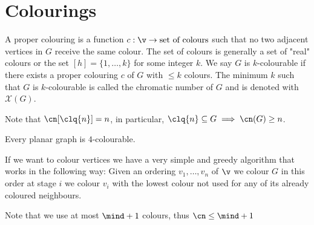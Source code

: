 \chapter{Colourings}
A proper colouring is a function $c: \v \rightarrow \text{set of colours}$ such that no two adjacent vertices in $G$ receive the same colour. The set of colours is generally a set of "real" colours or the set $[h] = \{1, \dots, k\}$ for some integer $k$. We say $G$ is $k$-colourable if there exists a proper colouring $c$ of $G$ with $\leq k$ colours. The minimum $k$ such that $G$ is $k$-colourable is called the chromatic number of $G$ and is denoted with $\mathcal{X}(G)$.

Note that $\cn[\clq{n}] = n$, in particular, $\clq{n} \subseteq G \implies \cn(G) \geq n$.
\begin{customtheorem}{6.1}
\label{theorem:6.1}
    Every planar graph is $4$-colourable.
\end{customtheorem}
If we want to colour vertices we have a very simple and greedy algorithm that works in the following way: Given an ordering $v_1, \dots, v_n$ of $\v$ we colour $G$ in this order at stage $i$ we colour $v_i$ with the lowest colour not used for any of its already coloured neighbours.

Note that we use at most $\mind + 1$ colours, thus $\cn \leq \mind + 1$